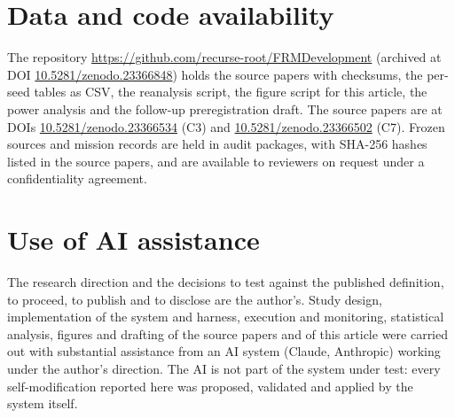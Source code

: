 \documentclass[11pt]{article}
\begin{document}
\section*{Data and code availability}

The repository \url{https://github.com/recurse-root/FRMDevelopment} (archived at DOI \href{https://doi.org/10.5281/zenodo.23366848}{10.5281/zenodo.23366848}) holds the source papers with checksums, the per-seed tables as CSV, the reanalysis script, the figure script for this article, the power analysis and the follow-up preregistration draft. The source papers are at DOIs \href{https://doi.org/10.5281/zenodo.23366534}{10.5281/zenodo.23366534} (C3) and \href{https://doi.org/10.5281/zenodo.23366502}{10.5281/zenodo.23366502} (C7). Frozen sources and mission records are held in audit packages, with SHA-256 hashes listed in the source papers, and are available to reviewers on request under a confidentiality agreement.

\section*{Use of AI assistance}

The research direction and the decisions to test against the published definition, to proceed, to publish and to disclose are the author's. Study design, implementation of the system and harness, execution and monitoring, statistical analysis, figures and drafting of the source papers and of this article were carried out with substantial assistance from an AI system (Claude, Anthropic) working under the author's direction. The AI is not part of the system under test: every self-modification reported here was proposed, validated and applied by the system itself.
\end{document}
